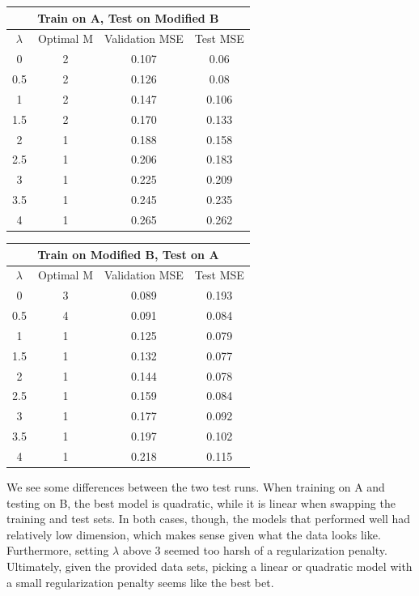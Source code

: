 \documentclass[8pt]{article}
\begin{document}
\begin{center}
 \begin{tabular}{||c c c c||} 
 \hline
 \multicolumn{4}{|c|}{Train on A, Test on Modified B} \\
 \hline
 \hline
 $\lambda$ & Optimal M & Validation MSE & Test MSE\\ [0.5ex] 
 \hline\hline
 0 & 2 & 0.107 & 0.06 \\ 
 \hline
 0.5 & 2 & 0.126 & 0.08 \\
 \hline
 1 & 2 & 0.147 & 0.106 \\
 \hline
 1.5 & 2 & 0.170 & 0.133 \\
 \hline
2 & 1 & 0.188 & 0.158 \\
 \hline
2.5 & 1 & 0.206 & 0.183 \\
 \hline
3 & 1 & 0.225 & 0.209 \\
 \hline
 3.5 & 1 & 0.245 & 0.235 \\
 \hline
4 & 1 & 0.265 & 0.262 \\
 \hline
\end{tabular}
\quad
 \begin{tabular}{||c c c c||} 
 \hline
 \multicolumn{4}{|c|}{Train on Modified B, Test on A} \\
 \hline
 \hline
 $\lambda$ & Optimal M & Validation MSE & Test MSE\\ [0.5ex] 
 \hline\hline
 0 & 3 & 0.089 & 0.193 \\ 
 \hline
 0.5 & 4 & 0.091 & 0.084 \\
 \hline
 1 & 1 & 0.125 & 0.079 \\
 \hline
 1.5 & 1 & 0.132 & 0.077 \\
 \hline
2 & 1 & 0.144 & 0.078 \\
 \hline
2.5 & 1 & 0.159 & 0.084 \\
 \hline
3 & 1 & 0.177 & 0.092 \\
 \hline
 3.5 & 1 & 0.197 & 0.102 \\
 \hline
4 & 1 & 0.218 & 0.115 \\
 \hline
\end{tabular}
\end{center}

We see some differences between the two test runs. When training on A and testing on B, the best model is quadratic, while it is linear when swapping the training and test sets. In both cases, though, the models that performed well had relatively low dimension, which makes sense given what the data looks like. Furthermore, setting $\lambda$ above 3 seemed too harsh of a regularization penalty. Ultimately, given the provided data sets, picking a linear or quadratic model with a small regularization penalty seems like the best bet.
\end{document}
